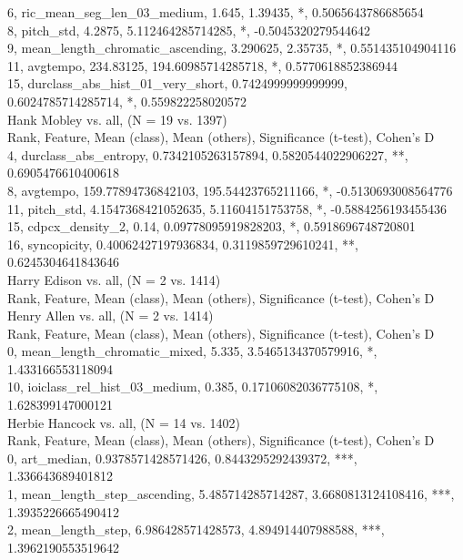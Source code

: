 6, ric_mean_seg_len_03_medium, 1.645, 1.39435, *, 0.5065643786685654\\
8, pitch_std, 4.2875, 5.112464285714285, *, -0.5045320279544642\\
9, mean_length_chromatic_ascending, 3.290625, 2.35735, *, 0.551435104904116\\
11, avgtempo, 234.83125, 194.60985714285718, *, 0.5770618852386944\\
15, durclass_abs_hist_01_very_short, 0.7424999999999999, 0.6024785714285714, *, 0.559822258020572\\
Hank Mobley vs. all, (N = 19 vs. 1397)\\
Rank, Feature, Mean (class), Mean (others), Significance (t-test), Cohen's D\\
4, durclass_abs_entropy, 0.7342105263157894, 0.5820544022906227, **, 0.6905476610400618\\
8, avgtempo, 159.77894736842103, 195.54423765211166, *, -0.5130693008564776\\
11, pitch_std, 4.1547368421052635, 5.11604151753758, *, -0.5884256193455436\\
15, cdpcx_density_2, 0.14, 0.09778095919828203, *, 0.5918696748720801\\
16, syncopicity, 0.40062427197936834, 0.3119859729610241, **, 0.6245304641843646\\
Harry Edison vs. all, (N = 2 vs. 1414)\\
Rank, Feature, Mean (class), Mean (others), Significance (t-test), Cohen's D\\
Henry Allen vs. all, (N = 2 vs. 1414)\\
Rank, Feature, Mean (class), Mean (others), Significance (t-test), Cohen's D\\
0, mean_length_chromatic_mixed, 5.335, 3.5465134370579916, *, 1.433166553118094\\
10, ioiclass_rel_hist_03_medium, 0.385, 0.17106082036775108, *, 1.628399147000121\\
Herbie Hancock vs. all, (N = 14 vs. 1402)\\
Rank, Feature, Mean (class), Mean (others), Significance (t-test), Cohen's D\\
0, art_median, 0.9378571428571426, 0.8443295292439372, ***, 1.336643689401812\\
1, mean_length_step_ascending, 5.485714285714287, 3.6680813124108416, ***, 1.3935226665490412\\
2, mean_length_step, 6.986428571428573, 4.894914407988588, ***, 1.3962190553519642\\
